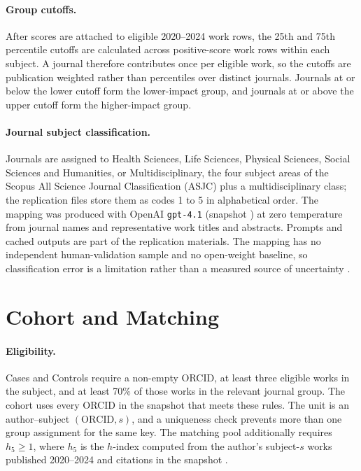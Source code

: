 \documentclass[12pt]{article}
\begin{document}
\paragraph{Group cutoffs.}  After scores are attached to eligible 2020--2024 work rows, the 25th and 75th percentile cutoffs are calculated across positive-score work rows within each subject.  A journal therefore contributes once per eligible work, so the cutoffs are publication weighted rather than percentiles over distinct journals.  Journals at or below the lower cutoff form the lower-impact group, and journals at or above the upper cutoff form the higher-impact group.

\paragraph{Journal subject classification.}  Journals are assigned to Health Sciences, Life Sciences, Physical Sciences, Social Sciences and Humanities, or Multidisciplinary, the four subject areas of the Scopus All Science Journal Classification (ASJC) plus a multidisciplinary class; the replication files store them as codes 1 to 5 in alphabetical order.  The mapping was produced with OpenAI \texttt{gpt-4.1} (snapshot ) at zero temperature from journal names and representative work titles and abstracts.  Prompts and cached outputs are part of the replication materials.  The mapping has no independent human-validation sample and no open-weight baseline, so classification error is a limitation rather than a measured source of uncertainty \parencite{LLMGuidelines2024}.

\section{Cohort and Matching}
\label{app:matching}

\paragraph{Eligibility.}  Cases and Controls require a non-empty ORCID, at least three eligible works in the subject, and at least 70\% of those works in the relevant journal group.  The cohort uses every ORCID in the snapshot that meets these rules.  The unit is an author--subject $(\mathrm{ORCID},s)$, and a uniqueness check prevents more than one group assignment for the same key.  The matching pool additionally requires $h_5\geq1$, where $h_5$ is the $h$-index computed from the author's subject-$s$ works published 2020--2024 and citations in the snapshot \parencite{Hirsch2005}.
\end{document}
